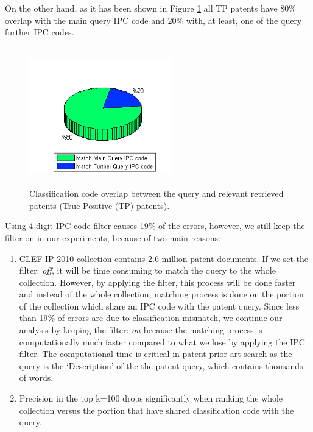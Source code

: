 On the other hand, as it has been shown in Figure \ref{fig:tpipcoverlap} all TP patents have 80\% overlap with the main query IPC code and 20\% with, at least, one of the query further IPC codes. 
\begin{figure}[t!]
   \centering
   \includegraphics[width=0.55\textwidth,height=60mm]{figs/ipcOverlap-TPs.png}
   \caption{Classification code overlap between the query and relevant retrieved patents (True Positive (TP) patents).}   
   \label{fig:tpipcoverlap} 
\end{figure}
Using 4-digit IPC code filter causes 19\% of the errors, however, we still keep the filter on in our experiments, because of two main reasons: 
\begin{enumerate}
\item CLEF-IP 2010 collection contains 2.6 million patent documents. If we set the filter: \textit{off}, it will be time consuming to match the query to the whole collection. However, by applying the filter, this process will be done faster and instead of the whole collection, matching process is done on the portion of the collection which share an IPC code with the patent query. Since less than 19\% of errors are due to classification mismatch, we continue our analysis by keeping the filter: \textit{on} because the matching process is computationally much faster compared to what we lose by applying the IPC filter. The computational time is critical in patent prior-art search as the query is the `Description' of the the patent query, which contains thousands of words.   
\item Precision in the top k=100 drops significantly when ranking the whole collection versus the portion that have shared classification code with the query.  
\end{enumerate}
